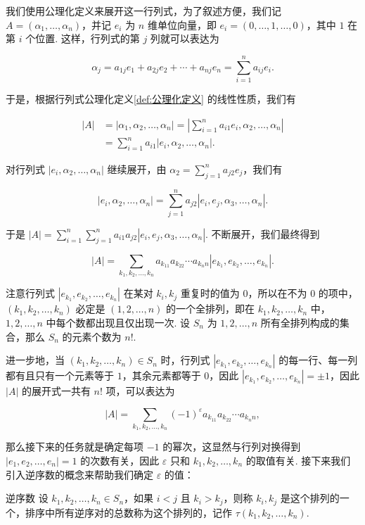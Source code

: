 我们使用公理化定义来展开这一行列式，为了叙述方便，我们记 $A = (\alpha_1,\ldots,\alpha_n)$，并记 $e_i$ 为 $n$ 维单位向量，即 $e_i = (0,\ldots,1,\ldots,0)$，其中 $1$ 在第 $i$ 个位置. 这样，行列式的第 $j$ 列就可以表达为

\[\alpha_j = a_{1j}e_1 + a_{2j}e_2 + \cdots + a_{nj}e_n = \sum_{i=1}^{n}a_{ij}e_i.\]

于是，根据行列式公理化定义\autoref{def:公理化定义} 的线性性质，我们有

\begin{align*}
    |A| & = |\alpha_1,\alpha_2,\ldots,\alpha_n| = |\sum\limits_{i=1}^{n}a_{i1}e_i,\alpha_2,\ldots,\alpha_n| \\
        & = \sum\limits_{i=1}^{n}a_{i1}|e_i,\alpha_2,\ldots,\alpha_n|.
\end{align*}

对行列式 $|e_i,\alpha_2,\ldots,\alpha_n|$ 继续展开，由 $\alpha_2 = \sum\limits_{j=1}^{n}a_{j2}e_j$，我们有

\[|e_i,\alpha_2,\ldots,\alpha_n| = \sum\limits_{j=1}^{n}a_{j2}|e_i,e_j,\alpha_3,\ldots,\alpha_n|.\]

于是 $|A| = \sum\limits_{i=1}^{n}\sum\limits_{j=1}^{n}a_{i1}a_{j2}|e_i,e_j,\alpha_3,\ldots,\alpha_n|$. 不断展开，我们最终得到

\[|A| = \sum\limits_{k_1,k_2,\ldots,k_n} a_{k_11}a_{k_22}\cdots a_{k_nn}|e_{k_1},e_{k_2},\ldots,e_{k_n}|.\]

注意行列式 $|e_{k_1},e_{k_2},\ldots,e_{k_n}|$ 在某对 $k_i,k_j$ 重复时的值为 $0$，所以在不为 $0$ 的项中，$(k_1,k_2,\ldots,k_n)$ 必定是 $(1,2,\ldots,n)$ 的一个全排列，即在 $k_1,k_2,\ldots,k_n$ 中，$1,2,\ldots,n$ 中每个数都出现且仅出现一次. 设 $S_n$ 为 $1,2,\ldots,n$ 所有全排列构成的集合，那么 $S_n$ 的元素个数为 $n!$.

进一步地，当 $(k_1,k_2,\ldots,k_n) \in S_n$ 时，行列式 $|e_{k_1},e_{k_2},\ldots,e_{k_n}|$ 的每一行、每一列都有且只有一个元素等于 $1$，其余元素都等于 $0$，因此 $|e_{k_1},e_{k_2},\ldots,e_{k_n}| = \pm 1$，因此 $|A|$ 的展开式一共有 $n!$ 项，可以表达为

\[|A| = \sum\limits_{k_1,k_2,\ldots,k_n} (-1)^\varepsilon a_{k_11}a_{k_22}\cdots a_{k_nn},\]

那么接下来的任务就是确定每项 $-1$ 的幂次，这显然与行列对换得到 $|e_1,e_2,\ldots,e_n| = 1$ 的次数有关，因此 $\varepsilon$ 只和 $k_1,k_2,\ldots,k_n$ 的取值有关. 接下来我们引入逆序数的概念来帮助我们确定 $\varepsilon$ 的值：

\begin{definition}{逆序数}{}
    设 $k_1,k_2,\ldots,k_n \in S_n$，如果 $i < j$ 且 $k_i > k_j$，则称 $k_i,k_j$ 是这个排列的一个，排序中所有逆序对的总数称为这个排列的，记作 $\tau(k_1,k_2,\ldots,k_n)$.
\end{definition}

